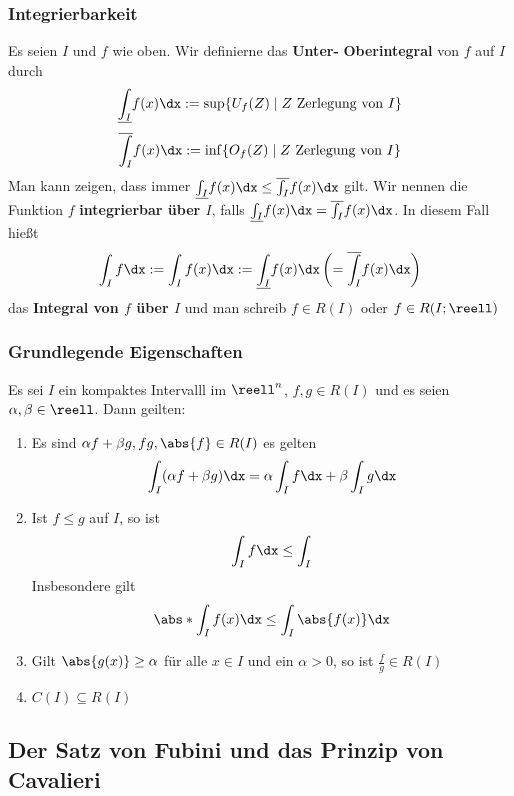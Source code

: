 \documentclass{kit}
\begin{document}
    \subsubsection{Integrierbarkeit}
      Es seien $I$ und $f$ wie oben. Wir definierne das \textbf{Unter-}  \textbf{Oberintegral} von $f$ auf $I$ 
      durch
      $$\underline{\int_I}f(x)\dx:=\sup\{U_f(Z)\mid Z\text{ Zerlegung von }I\}$$
      $$\overline{\int_I}f(x)\dx:=\inf\{O_f(Z)\mid Z\text{ Zerlegung von }I\}$$
      Man kann zeigen, dass immer $\underline{\int_I}f(x)\dx\le\overline{\int_I}f(x)\dx$ gilt. Wir nennen die Funktion $f$
      \textbf{integrierbar über $I$}, falls $\underline{\int_I}f(x)\dx=\overline{\int_I}f(x)\dx$. In diesem Fall hießt
      $$\int_If\dx:=\int_If(x)\dx:=\underline{\int_I}f(x)\dx\left(=\overline{\int_I}f(x)\dx\right)$$
      das \textbf{Integral von $f$ über $I$} und man schreib $f\in R(I)$ oder $f\in R(I;\reell)$
    \subsubsection{Grundlegende Eigenschaften}
      Es sei $I$ ein kompaktes Intervalll im $\reell^n$, $f,g\in R(I)$ und es seien $\alpha,\beta\in\reell$. Dann geilten:
      \begin{enumerate}
        \item Es sind $\alpha f+\beta g,fg,\abs{f}\in R(I)$ es gelten
          $$\int_I(\alpha f+\beta g)\dx=\alpha\int_If\dx+\beta\int_Ig\dx$$
        \item Ist $f\le g$ auf $I$, so ist
          $$\int_If\dx\le\int_I$$
          Insbesondere gilt
          $$\abs*{\int_If(x)\dx}\le\int_I\abs{f(x)}\dx$$
        \item Gilt $\abs{g(x)}\ge\alpha$ für alle $x\in I$ und ein $\alpha>0$, so ist $\frac{f}{g}\in R(I)$
      \item $C(I)\subseteq R(I)$
      \end{enumerate}
  \subsection{Der Satz von Fubini und das Prinzip von Cavalieri}
\end{document}
